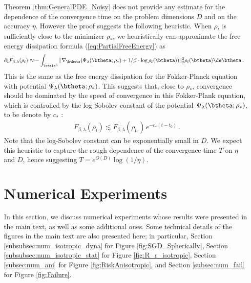 \documentclass[11pt]{article}
\begin{document}
Theorem \ref{thm:GeneralPDE_Noisy} does not provide any estimate for
the dependence of the convergence time on the problem dimensions $D$ and on the accuracy $\eta$.
However the proof suggests the following heuristic. When $\rho_t$ is sufficiently close to the minimizer $\rho_*$,
we heuristically can approximate the free energy dissipation formula (\ref{eq:PartialFreeEnergy}) as
%
\begin{align}
%
\partial_t F_{\beta, \lambda}(\rho_t) \approx& - \int_{\reals^d} \| \nabla_\btheta (\Psi_\lambda(\btheta; \rho_*) + 1/\beta \cdot \log \rho_t(\btheta)) \|_2^2 \rho_t(\btheta) \de \btheta\, .
%
\end{align}
%
This is the same as the free energy dissipation for the Fokker-Planck equation with potential $\Psi_{\lambda}(\btheta;\rho_*)$. This suggests that, close to $\rho_*$,
convergence should be dominated by the speed of convergence in this Fokker-Plank equation, which is controlled by the log-Sobolev constant of the potential 
 $\Psi_{\lambda}(\btheta;\rho_*)$, to be denote by $c_{*}$ \cite{markowich2000trend}:
%
\begin{align}
%
F_{\beta, \lambda}(\rho_t) \lesssim F_{\beta, \lambda}(\rho_{t_0}) \, e^{-c_*(t-t_0)} \, .
%
\end{align}
%
Note that the log-Sobolev constant can be exponentially small in $D$.
We expect this heuristic to capture the rough dependence of the convergence time $T$ on $\eta$ and $D$, hence
suggesting $T= e^{O(D)}\log (1/\eta)$. 

\section{Numerical Experiments}

In this section, we discuss numerical experiments whose results were presented in the main text, as well as some additional ones. 
Some technical details of the figures in the main text are also presented here; in particular, Section \ref{subsubsec:num_isotropic_dyna} for Figure \ref{fig:SGD_Spherically}, Section \ref{subsubsec:num_isotropic_stat} for 
Figure \ref{fig:R_r_isotropic}, Section \ref{subsec:num_ani} for Figure \ref{fig:RiskAnisotropic}, and Section \ref{subsec:num_fail} for Figure \ref{fig:Failure}.
\end{document}
